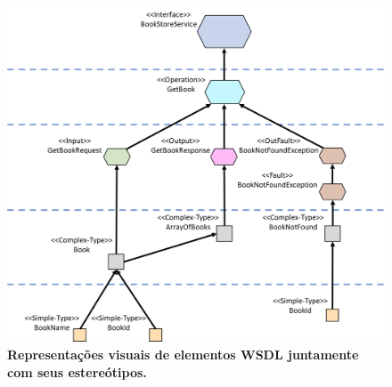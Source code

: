 \begin{figure}[h]
    \includegraphics[scale=0.4]{3-notacao-visual-sawsdl/imagens/grafo-wsdl.PNG}
    \centering
    \caption[Representações visuais de elementos WSDL juntamente com a codificação dupla]{\textbf{Representações visuais de elementos WSDL juntamente com seus estereótipos.}}
    \label{fig:grafo-wsdl}
\end{figure}